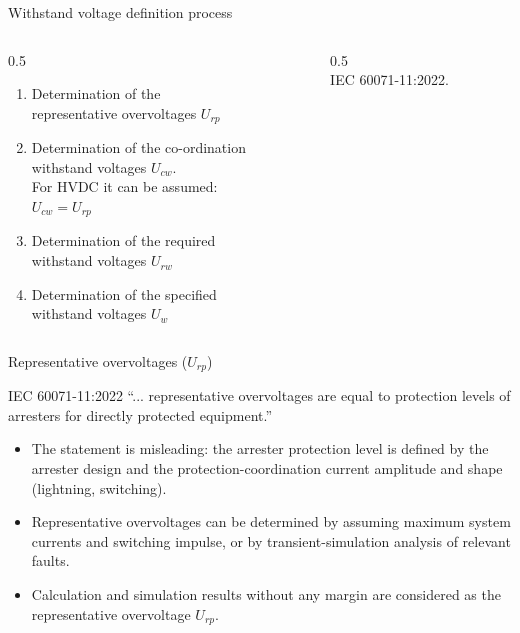 

\begin{frame}{Withstand voltage definition process}
  \begin{columns}[c,onlytextwidth]
    \begin{column}{0.5\textwidth}
      \begin{enumerate}
        \setlength{\itemsep}{0.4em}
        \item Determination of the \\representative overvoltages $U_{rp}$
        \item Determination of the co-ordination \\withstand voltages $U_{cw}$. \\For HVDC it can be assumed:\\
              \quad$U_{cw} = U_{rp}$
        \item Determination of the required \\ withstand voltages $U_{rw}$
        \item Determination of the specified \\ withstand voltages $U_w$
      \end{enumerate}
    \end{column}
    \begin{column}{0.5\textwidth}
      \centering
      \\[0.3em]
      {\color{atGray}\footnotesize IEC 60071-11:2022.}
    \end{column}
  \end{columns}
  \vspace{0.2em}
\end{frame}

\begin{frame}{Representative overvoltages ($U_{rp}$)}
  \begin{block}{IEC 60071-11:2022}
    ``... representative overvoltages are equal to protection levels of
    arresters for directly protected equipment.''
  \end{block}
  \begin{itemize}
    \setlength{\itemsep}{0.4em}
    \item The statement is misleading: the arrester protection level is
          defined by the arrester design and the protection-coordination
          current amplitude and shape (lightning, switching).
    \item Representative overvoltages can be determined by assuming maximum
          system currents and switching impulse, or by transient-simulation
          analysis of relevant faults.
    \item Calculation and simulation results without any margin are
          considered as the representative overvoltage $U_{rp}$.
  \end{itemize}
\end{frame}

